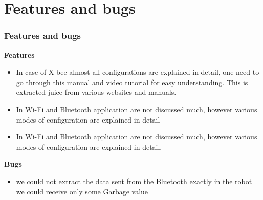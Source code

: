\documentclass[table,10pt,blue]{beamer}	%
\begin{document}
{
\section{Features and bugs} %
\begin{frame}
	\frametitle{Features and bugs} \color{red}
	\textbf{Features}
	\begin{itemize} \color{blue}
		\item In case of X-bee almost all configurations are explained in detail, one need to go through this manual and video tutorial for easy understanding. This is extracted juice from various websites and manuals.
		\item In Wi-Fi and Bluetooth application are not discussed much, however various modes of configuration are explained in detail
		\item In Wi-Fi and Bluetooth application are not discussed much, however various modes of configuration are explained in detail.	
	\end{itemize}
	\textbf{Bugs}
	
\begin{itemize} \color{blue}
\item we could not extract the data sent from the Bluetooth exactly in the robot  we could receive only some Garbage value  
\end{itemize}
\color{black}
\end{frame}
}
\end{document}
